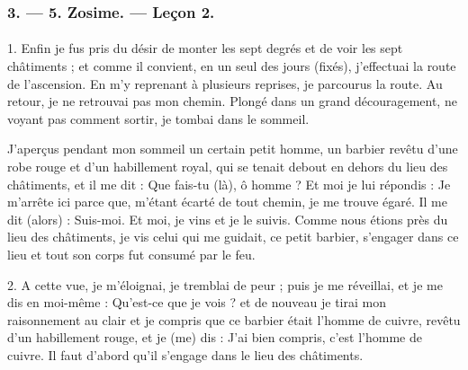 \documentclass[a4paper, 11pt, oneside, polutonikogreek, french]{article}
\begin{document}
\bigskip
\centerline{\EightStarTaper}
\centerline{\EightStarTaper\EightStarTaper}
\bigskip

\subsubsection{3. --- 5. Zosime. --- Leçon 2.}
\paragraph{}
1. Enfin je fus pris du désir de monter les sept degrés et de voir les sept châtiments ; et comme il convient, en un seul des jours (fixés), j'effectuai la route de l'ascension. En m'y reprenant à plusieurs reprises, je parcourus la route. Au retour, je ne retrouvai pas mon chemin. Plongé dans un grand découragement, ne voyant pas comment sortir, je tombai dans le sommeil.

J'aperçus pendant mon sommeil un certain petit homme, un barbier revêtu d'une robe rouge et d'un habillement royal, qui se tenait debout en dehors du lieu des châtiments, et il me dit : Que fais-tu (là), ô homme ? Et moi je lui répondis : Je m'arrête ici parce que, m'étant écarté de tout chemin, je me trouve égaré. Il me dit (alors) : Suis-moi. Et moi, je vins et je le suivis. Comme nous étions près du lieu des châtiments, je vis celui qui me guidait, ce petit barbier, s'engager dans ce lieu et tout son corps fut consumé par le feu.

2. A cette vue, je m'éloignai, je tremblai de peur ; puis je me réveillai, et je me dis en moi-même : Qu'est-ce que je vois ? et de nouveau je tirai mon raisonnement au clair et je compris que ce barbier était l'homme de cuivre, revêtu d'un habillement rouge, et je (me) dis : J'ai bien compris, c'est l'homme de cuivre. Il faut d'abord qu'il s'engage dans le lieu des châtiments.
\end{document}
